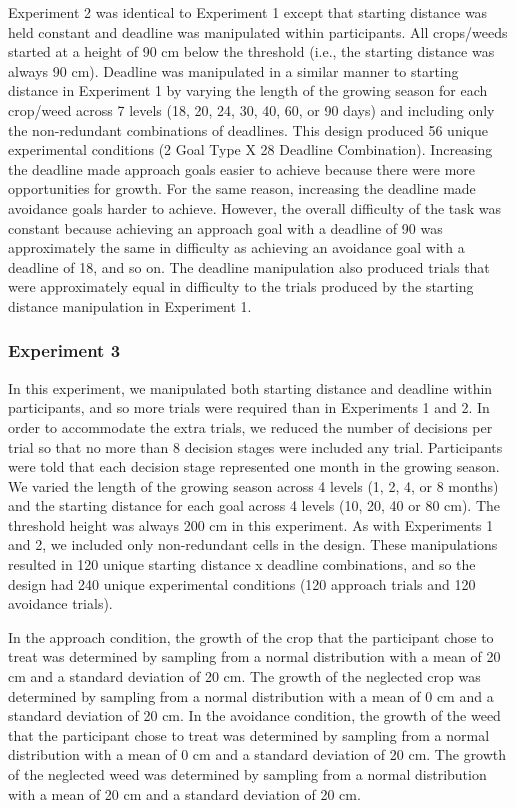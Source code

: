 \documentclass[a4paper,doc,natbib,donotrepeattitle]{apa6}
\begin{document}
Experiment 2 was identical to Experiment 1 except that starting distance was held constant and deadline was manipulated within participants. All crops/weeds started at a height of 90 cm below the threshold (i.e., the starting distance was always 90 cm). Deadline was manipulated in a similar manner to starting distance in Experiment 1 by varying the length of the growing season for each crop/weed across 7 levels (18, 20, 24, 30, 40, 60, or 90 days) and including only the non-redundant combinations of deadlines. This design produced 56 unique experimental conditions (2 Goal Type X 28 Deadline Combination). Increasing the deadline made approach goals easier to achieve because there were more opportunities for growth. For the same reason, increasing the deadline made avoidance goals harder to achieve. However, the overall difficulty of the task was constant because achieving an approach goal with a deadline of 90 was approximately the same in difficulty as achieving an avoidance goal with a deadline of 18, and so on. The deadline manipulation also produced trials that were approximately equal in difficulty to the trials produced by the starting distance manipulation in Experiment 1.

\subsubsection{Experiment 3}

In this experiment, we manipulated both starting distance and deadline within participants, and so more trials were required than in Experiments 1 and 2. In order to accommodate the extra trials, we reduced the number of decisions per trial so that no more than 8 decision stages were included any trial. Participants were told that each decision stage represented one month in the growing season.  We varied the length of the growing season across 4 levels (1, 2, 4, or 8 months) and the starting distance for each goal across 4 levels (10, 20, 40 or 80 cm). The threshold height was always 200 cm in this experiment. As with Experiments 1 and 2, we included only non-redundant cells in the design. These manipulations resulted in 120 unique starting distance x deadline combinations, and so the design had 240 unique experimental conditions (120 approach trials and 120 avoidance trials).

In the approach condition, the growth of the crop that the participant chose to treat was determined by sampling from a normal distribution with a mean of 20 cm and a standard deviation of 20 cm. The growth of the neglected crop was determined by sampling from a normal distribution with a mean of 0 cm and a standard deviation of 20 cm. In the avoidance condition, the growth of the weed that the participant chose to treat was determined by sampling from a normal distribution with a mean of 0 cm and a standard deviation of 20 cm. The growth of the neglected weed was determined by sampling from a normal distribution with a mean of 20 cm and a standard deviation of 20 cm.
\end{document}
